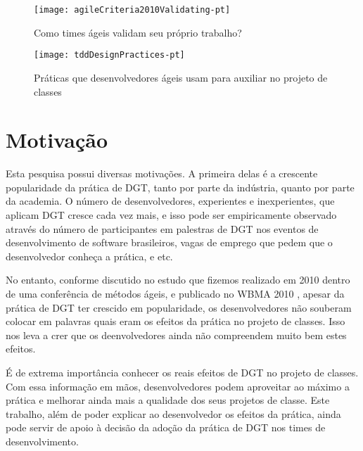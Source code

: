 \begin{figure}[ht]
  \begin{minipage}[b]{0.45\linewidth}
    \centering
    \texttt{[image: agileCriteria2010Validating-pt]}
    \caption{Como times ágeis validam seu próprio trabalho?}
    \label{fig:wambler-agile-2010}
  \end{minipage}
  \hspace{0.5cm}
  \begin{minipage}[b]{0.45\linewidth}
    \centering
    \texttt{[image: tddDesignPractices-pt]}
    \caption{Práticas que desenvolvedores ágeis usam para auxiliar no projeto de classes}  
    \label{fig:wambler-tdd-2008}
  \end{minipage}
\end{figure}			

\section{Motivação}

Esta pesquisa possui diversas motivações. A primeira delas é a crescente
popularidade da prática de DGT, tanto por parte da indústria, quanto 
por parte da academia. O número de desenvolvedores, experientes e inexperientes,
que aplicam DGT cresce cada vez mais, e isso pode ser empiricamente
observado através do número de participantes em palestras de DGT nos
eventos de desenvolvimento de software brasileiros, vagas de emprego
que pedem que o desenvolvedor conheça a prática, e etc.

No entanto, conforme discutido no estudo que fizemos 
realizado em 2010 dentro de uma conferência de 
métodos ágeis, e publicado no WBMA 2010 \cite{aniche-wbma}, apesar da prática de 
DGT ter crescido em popularidade, os desenvolvedores não souberam
colocar em palavras quais eram os efeitos da prática no projeto de classes.
Isso nos leva a crer que os deenvolvedores ainda 
não compreendem muito bem estes efeitos.

É de extrema importância conhecer os reais efeitos de DGT no projeto de classes. Com essa
informação em mãos, desenvolvedores podem aproveitar ao máximo
a prática e melhorar ainda mais a qualidade dos seus projetos
de classe. 
Este trabalho, além de poder explicar ao desenvolvedor os efeitos
da prática, ainda pode servir de apoio à decisão da adoção da prática
de DGT nos times de desenvolvimento.


